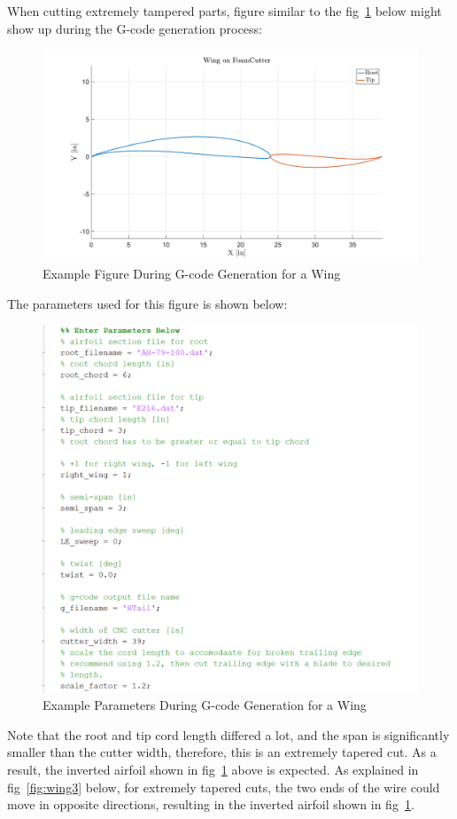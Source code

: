 \documentclass[titlepage,12pt,letter]{report}
\numberwithin{equation}{chapter}
\begin{document}
When cutting extremely tampered parts, figure similar to the fig~\ref{fig:wing1} below might show up during the G-code generation process:
\begin{figure} [H]
	\includegraphics[width = 0.9\linewidth]{./Figures/wing_example.png}
	\caption{Example Figure During G-code Generation for a Wing}
	\label{fig:wing1}
\end{figure}
The parameters used for this figure is shown below:
\begin{figure} [H]
	\includegraphics[width = 0.7\linewidth]{./Figures/wing_example2.png}
	\caption{Example Parameters During G-code Generation for a Wing}
	\label{fig:wing2}
\end{figure}
Note that the root and tip cord length differed a lot, and the span is significantly smaller than the cutter width, therefore, this is an extremely tapered cut. As a result, the inverted airfoil shown in fig~\ref{fig:wing1} above is expected. As explained in fig~\ref{fig:wing3} below, for extremely tapered cuts, the two ends of the wire could move in opposite directions, resulting in the inverted airfoil shown in fig~\ref{fig:wing1}.
\end{document}

